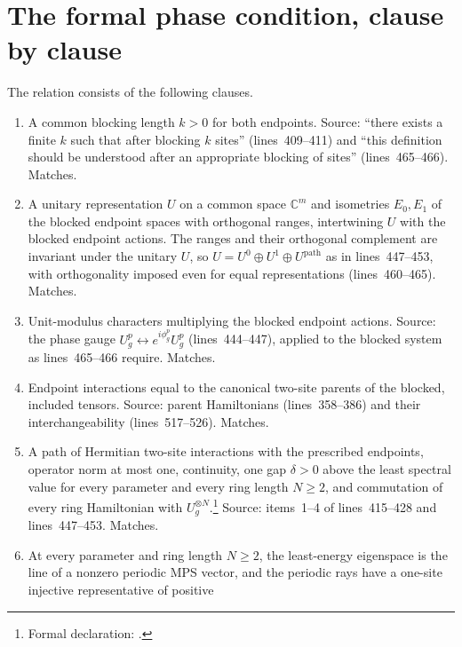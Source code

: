 \documentclass{article}
\begin{document}
\section{The formal phase condition, clause by clause}

The relation  consists of the
following clauses.
\begin{enumerate}
    \item A common blocking length $k>0$ for both endpoints. Source: ``there
          exists a finite $k$ such that after blocking $k$ sites''
          (lines~409--411) and ``this definition should be understood after an
          appropriate blocking of sites'' (lines~465--466). Matches.
    \item A unitary representation $U$ on a common space $\mathbb C^m$ and
          isometries $E_0,E_1$ of the blocked endpoint spaces with orthogonal
          ranges, intertwining $U$ with the blocked endpoint actions. The ranges
          and their orthogonal complement are invariant under the unitary $U$,
          so $U=U^0\oplus U^1\oplus U^{\mathrm{path}}$ as in lines~447--453,
          with orthogonality imposed even for equal representations
          (lines~460--465). Matches.
    \item Unit-modulus characters multiplying the blocked endpoint actions.
          Source: the phase gauge $U^p_g\leftrightarrow e^{i\phi^p_g}U^p_g$
          (lines~444--447), applied to the blocked system as lines~465--466
          require. Matches.
    \item Endpoint interactions equal to the canonical two-site parents of the
          blocked, included tensors. Source: parent Hamiltonians
          (lines~358--386) and their interchangeability (lines~517--526).
          Matches.
    \item A path of Hermitian two-site interactions with the prescribed
          endpoints, operator norm at most one, continuity, one gap $\delta>0$
          above the least spectral value for every parameter and every ring
          length $N\ge2$, and commutation of every ring Hamiltonian with
          $U_g^{\otimes N}$.\footnote{Formal declaration:
              .}
          Source: items~1--4 of lines~415--428 and lines~447--453. Matches.
    \item At every parameter and ring length $N\ge2$, the least-energy
          eigenspace is the line of a nonzero periodic MPS vector, and the
          periodic rays have a one-site injective representative of positive

\end{enumerate}
\end{document}
